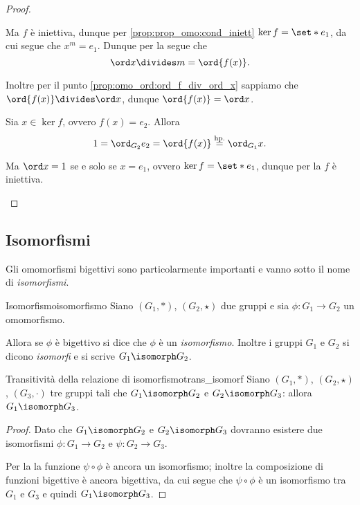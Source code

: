 \begin{proof}
\begin{enumerate}[label={(\roman*)}]
\begin{description}
\begin{itemize}
                Ma $f$ è iniettiva, dunque per \ref{prop:prop_omo:cond_iniett} $\ker f = \set*{e_1}$, da cui segue che $x^m = e_1$. 
                Dunque per la  segue che \[
                    \ord x \divides m = \ord{f(x)}.    
                \]

                Inoltre per il punto \ref{prop:omo_ord:ord_f_div_ord_x} sappiamo che $\ord{f(x)} \divides \ord x$, dunque $\ord{f(x)} = \ord x$.
            \end{itemize} 
            \item[\boximplby] Sia $x \in \ker f$, ovvero $f(x) = e_2$. Allora \[
                1 = \ord_{G_2}{e_2} = \ord{f(x)} \stackrel{\text{hp.}}{=} \ord_{G_1}{x}.
            \] 
            
            Ma $\ord x = 1$ se e solo se $x = e_1$, ovvero $\ker f = \set*{e_1}$, dunque per la  $f$ è iniettiva.
        \end{description}
    \end{enumerate}
\end{proof}

\subsection{Isomorfismi}

Gli omomorfismi bigettivi sono particolarmente importanti e vanno sotto il nome di \emph{isomorfismi}.

\begin{definition}
    {Isomorfismo}{isomorfismo}
    Siano $(G_1, *)$, $(G_2, \star)$ due gruppi e sia $\phi : G_1 \to G_2$ un omomorfismo.

    Allora se $\phi$ è bigettivo si dice che $\phi$ è un \emph{isomorfismo}. Inoltre i gruppi $G_1$ e $G_2$ si dicono \emph{isomorfi} e si scrive $G_1 \isomorph G_2$.
\end{definition}

\begin{corollary}{Transitività della relazione di isomorfismo}{trans_isomorf}
    Siano $(G_1, *)$, $(G_2, \star)$, $(G_3, \cdot)$ tre gruppi tali che $G_1 \isomorph G_2$ e $G_2 \isomorph G_3$: allora $G_1 \isomorph G_3$.
\end{corollary}
\begin{proof}
    Dato che $G_1 \isomorph G_2$ e $G_2 \isomorph G_3$ dovranno esistere due isomorfismi $\phi : G_1 \to G_2$ e $\psi : G_2 \to G_3$.

    Per la  la funzione $\psi \circ \phi$ è ancora un isomorfismo; inoltre la composizione di funzioni bigettive è ancora bigettiva, da cui segue che $\psi \circ \phi$ è un isomorfismo tra $G_1$ e $G_3$ e quindi $G_1 \isomorph G_3$.
\end{proof}

